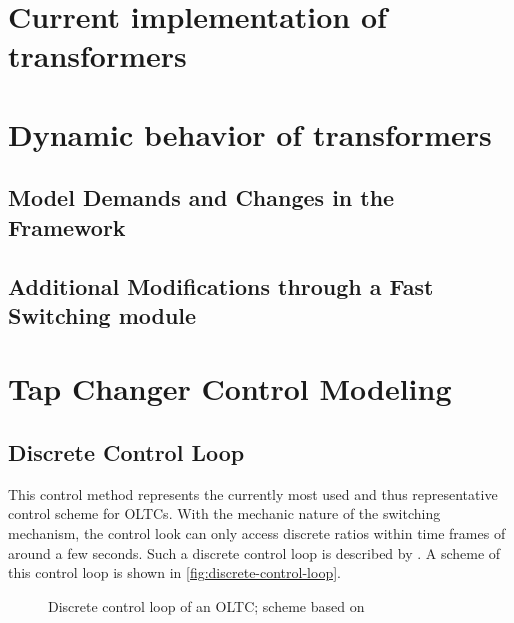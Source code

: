 \section{Current implementation of transformers}


\section{Dynamic behavior of transformers}


\subsection{Model Demands and Changes in the Framework}

\subsection{Additional Modifications through a Fast Switching module}

\section{Tap Changer Control Modeling}


\subsection{Discrete Control Loop}
This control method represents the currently most used and thus representative control scheme for \acsp{OLTC}. With the mechanic nature of the switching mechanism, the control look can only access discrete ratios within time frames of around a few seconds. Such a discrete control loop is described by \textcite{milanoHybridControlModel2011,milanoPowerSystemModelling2010}. A scheme of this control loop is shown in \autoref{fig:discrete-control-loop}.

\begin{figure}[htb!]
        \centering
        \caption{Discrete control loop of an \acs{OLTC}; scheme based on \textcite{milanoHybridControlModel2011}}
        \label{fig:discrete-control-loop}
\end{figure}


